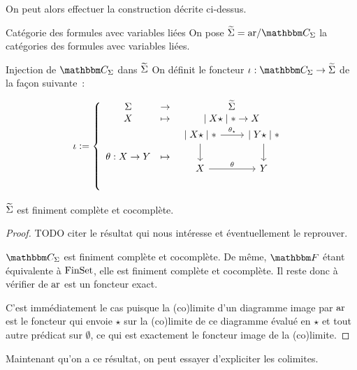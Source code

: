 On peut alors effectuer la construction décrite ci-dessus.

\begin{defi}{Catégorie des formules avec variables liées}
    On pose $\tsigma = \arf/\C_\Sigma$ la catégories des formules avec variables
    liées.
\end{defi}

\begin{defi}{Injection de $\C_\Sigma$ dans $\widetilde{\Sigma}$}
    On définit le foncteur $\iota:\C_\Sigma\rightarrow\tsigma$ de la façon suivante~:

    \[ \iota := \left\{\begin{array}{ccc}
        \Sigma & \rightarrow & \tsigma \\
        X      & \mapsto     & \mid X\star\mid\ast\rightarrow X \\
        \theta : X\rightarrow Y & \mapsto &
            \begin{tikzcd}
                \mid X\star\mid\ast\arrow[d]
                                   \arrow[r, "\theta_\star"]
                    & \mid Y\star\mid\ast\arrow[d] \\
                X\arrow[r, "\theta"]
                    & Y \\
            \end{tikzcd} \\
    \end{array}\right. \]
\end{defi}

\begin{prop}
    $\widetilde{\Sigma}$ est finiment complète et cocomplète.
\end{prop}

\begin{proof}
    TODO citer le résultat qui nous intéresse et éventuellement le reprouver.

    $\C_\Sigma$ est finiment complète et cocomplète. De même, $\cf$ étant équivalente
    à $\text{FinSet}$, elle est finiment complète et cocomplète. Il reste donc à vérifier de
    $\text{ar}$ est un foncteur exact.

    C'est immédiatement le cas puisque la (co)limite d'un diagramme image par $\text{ar}$ est
    le foncteur qui envoie $\star$ sur la (co)limite de ce diagramme évalué en $\star$
    et tout autre prédicat sur $\emptyset$, ce qui est exactement le foncteur image
    de la (co)limite.
\end{proof}

Maintenant qu'on a ce résultat, on peut essayer d'expliciter les colimites.

